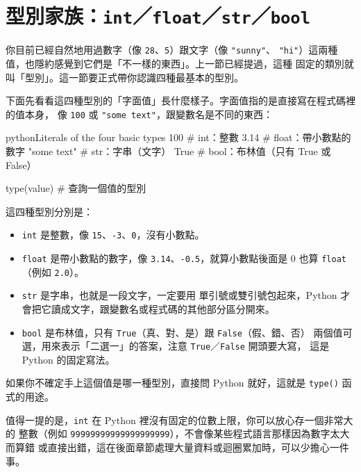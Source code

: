 \section{型別家族：\texttt{int}／\texttt{float}／\texttt{str}／\texttt{bool}}
\label{sec:type-family}

你目前已經自然地用過數字（像 \texttt{28}、\texttt{5}）跟文字（像 \texttt{"sunny"}、
\texttt{"hi"}）這兩種值，也隱約感覺到它們是「不一樣的東西」。上一節已經提過，這種
固定的類別就叫「型別」。這一節要正式帶你認識四種最基本的型別。

下面先看看這四種型別的「字面值」長什麼樣子。字面值指的是直接寫在程式碼裡的值本身，
像 \texttt{100} 或 \texttt{"some text"}，跟變數名是不同的東西：

\begin{code}{python}{Literals of the four basic types}
100          # int：整數
3.14         # float：帶小數點的數字
"some text"    # str：字串（文字）
True         # bool：布林值（只有 True 或 False）

type(value)     # 查詢一個值的型別
\end{code}

這四種型別分別是：

\begin{itemize}
\item \texttt{int} 是整數，像 \texttt{15}、\texttt{-3}、\texttt{0}，沒有小數點。
\item \texttt{float}
是帶小數點的數字，像 \texttt{3.14}、\texttt{-0.5}，就算小數點後面是 0 也算
\texttt{float}（例如 \texttt{2.0}）。
\item \texttt{str} 是字串，也就是一段文字，一定要用
單引號或雙引號包起來，Python 才會把它讀成文字，跟變數名或程式碼的其他部分區分開來。
\item \texttt{bool} 是布林值，只有 \texttt{True}（真、對、是）跟 \texttt{False}（假、錯、否）
兩個值可選，用來表示「二選一」的答案，注意 \texttt{True}／\texttt{False} 開頭要大寫，
這是 Python 的固定寫法。
\end{itemize}

如果你不確定手上這個值是哪一種型別，直接問 Python 就好，這就是
\texttt{type()} 函式的用途。

值得一提的是，\texttt{int} 在 Python 裡沒有固定的位數上限，你可以放心存一個非常大的
整數（例如 \texttt{99999999999999999999}），不會像某些程式語言那樣因為數字太大而算錯
或直接出錯，這在後面章節處理大量資料或迴圈累加時，可以少擔心一件事。


